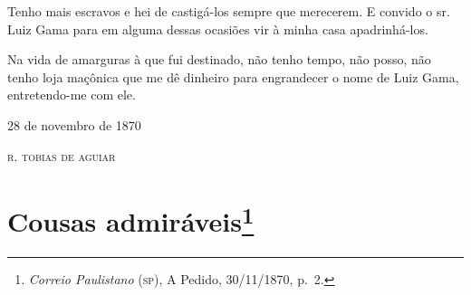 Tenho mais escravos e hei de castigá-los sempre que merecerem. E convido
o sr. Luiz Gama para em alguma dessas ocasiões vir à minha casa
apadrinhá-los.

Na vida de amarguras à que fui destinado, não tenho tempo, não posso,
não tenho loja maçônica que me dê dinheiro para engrandecer o nome de
Luiz Gama, entretendo-me com ele.

\begin{flushright}
28 de novembro de 1870

\textsc{r. tobias de aguiar}
\end{flushright}

\chapter{Cousas admiráveis\footnote{\emph{Correio Paulistano} (\textsc{sp}), A Pedido, 30/11/1870,
  p.~2.}} %

